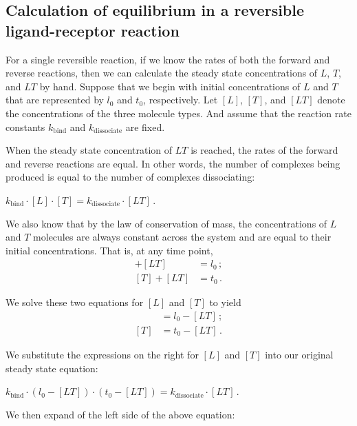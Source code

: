 \FloatBarrier
{}
\subsection{Calculation of equilibrium in a reversible ligand-receptor reaction}

For a single reversible reaction, if we know the rates of both the forward and reverse reactions, then we can calculate the steady state concentrations of $L$, $T$, and $LT$ by hand.  Suppose that we begin with initial concentrations of $L$ and $T$ that are represented by $l_0$ and $t_0$, respectively. Let $[L]$, $[T]$, and $[LT]$ denote the concentrations of the three molecule types. And assume that the reaction rate constants $k_\text{bind}$ and $k_\text{dissociate}$ are fixed.

When the steady state concentration of $LT$ is reached, the rates of the forward and reverse reactions are equal. In other words, the number of complexes being produced is equal to the number of complexes dissociating:

\begin{center}
$k_\text{bind} \cdot [L] \cdot [T] = k_\text{dissociate} \cdot [LT] $\,.

\end{center}

We also know that by the law of conservation of mass, the concentrations of $L$ and $T$ molecules are always constant across the system and are equal to their initial concentrations. That is, at any time point,
\begin{align*}
[L] + [LT] & = l_0\,;\\
[T] + [LT] & = t_0\,.
\end{align*}

\noindent We solve these two equations for $[L]$ and $[T]$ to yield
\begin{align*}
[L] & = l_0 - [LT]\,;\\
[T] & = t_0 - [LT]\,.
\end{align*}

\noindent We substitute the expressions on the right for $[L]$ and $[T]$ into our original steady state equation:

\begin{center}
$k_\text{bind} \cdot (l_0 - [LT]) \cdot (t_0 - [LT]) = k_\text{dissociate} \cdot [LT]$\,.
\end{center}

\noindent We then expand of the left side of the above equation:


